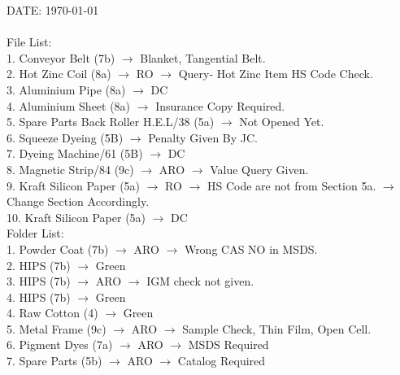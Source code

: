 \documentclass[12pt]{article}
\begin{document}
\noindent
DATE: \today
\\
\\
File List:
\\
1. Conveyor Belt (7b)
$\rightarrow$
Blanket, Tangential Belt.
\\
2. Hot Zinc Coil (8a)
$\rightarrow$
RO
$\rightarrow$
Query-
Hot Zinc Item HS Code Check.
\\
3. Aluminium Pipe (8a)
$\rightarrow$
DC
\\
4. Aluminium Sheet (8a)
$\rightarrow$
Insurance Copy Required.
\\
5. Spare Parts Back Roller H.E.L/38 (5a)
$\rightarrow$
Not Opened Yet.
\\
6. Squeeze Dyeing (5B)
$\rightarrow$
Penalty Given By JC.
\\
7. Dyeing Machine/61 (5B)
$\rightarrow$
DC
\\
8. Magnetic Strip/84 (9c)
$\rightarrow$
ARO
$\rightarrow$
Value Query Given.
\\
9. Kraft Silicon Paper (5a)
$\rightarrow$
RO
$\rightarrow$
HS Code are not from Section 5a.
$\rightarrow$
Change Section Accordingly.
\\
10. Kraft Silicon Paper (5a)
$\rightarrow$
DC
\\

\noindent
Folder List:
\\
1. Powder Coat (7b)
$\rightarrow$
ARO
$\rightarrow$
Wrong CAS NO in MSDS.
\\
2. HIPS (7b)
$\rightarrow$
Green
\\
3. HIPS (7b)
$\rightarrow$
ARO
$\rightarrow$
IGM check not given.
\\
4. HIPS (7b)
$\rightarrow$
Green
\\
4. Raw Cotton (4)
$\rightarrow$
Green
\\
5. Metal Frame (9c)
$\rightarrow$
ARO
$\rightarrow$
Sample Check, Thin Film, Open Cell.
\\
6. Pigment Dyes (7a)
$\rightarrow$
ARO
$\rightarrow$
MSDS Required
\\
7. Spare Parts (5b)
$\rightarrow$
ARO
$\rightarrow$
Catalog Required
\\
\end{document}

